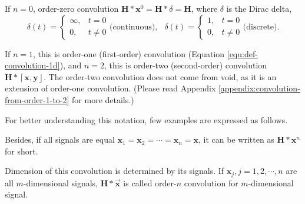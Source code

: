 \documentclass[twoside,11pt]{article}
\def\tvar#1{\mathbf{#1}} %
\def\vsymb#1{\vec{\mathbf{#1}}}
\def\lcerfl#1{\left\lceil{#1}\right\rfloor}
\begin{document}
If \(n = 0\), order-zero convolution \(\tvar{H} * \tvar{x}^0 = \tvar{H} * \delta = \tvar{H}\), where \(\delta\) is the Dirac delta,
\begin{equation*}
  \delta(t) = \left\{\begin{array}{cc}
    \infty, & t = 0   \\
    0,      & t \ne 0
  \end{array}\right.  \text{(continuous),}
  ~~~~
  \delta(t) = \left\{\begin{array}{cc}
    1, & t = 0   \\
    0, & t \ne 0
  \end{array}\right.  \text{(discrete).}
\end{equation*}

If \(n = 1\), this is order-one (first-order) convolution (Equation \ref{equ:def-convolution-1d}), and \(n = 2\), this is order-two (second-order) convolution \(\tvar{H} * \lcerfl{\tvar{x}, \tvar{y}}\).
The order-two convolution does not come from void, as it is an extension of order-one convolution. (Please read Appendix \ref{appendix:convolution-from-order-1-to-2} for more details.)

For better understanding this notation, few examples are expressed as follows.

\begin{figure}[H]
  \centering
\end{figure}

Besides, if all signals are equal \(\tvar{x}_1 = \tvar{x}_2 = \cdots = \tvar{x}_n = \tvar{x}\), it can be written as \(\tvar{H} * \tvar{x}^n\) for short.
\begin{figure}[H]
  \centering
\end{figure}

Dimension of this convolution is determined by its signals.
If \(\tvar{x}_j, j = 1, 2, \cdots, n\) are all \(m\)-dimensional signals, \(\tvar{H} * \vsymb{x}\) is called order-\(n\) convolution for \(m\)-dimensional signal.
\begin{figure}[H]
  \centering
\end{figure}
\end{document}
